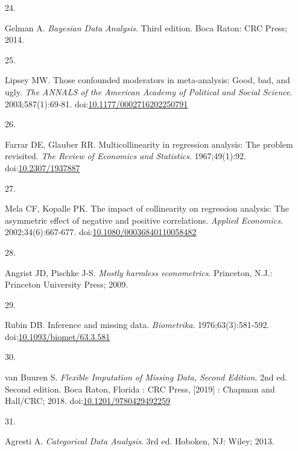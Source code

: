 \documentclass[
]{article}
\newlength{\cslhangindent}
\newlength{\csllabelwidth}
\newlength{\cslentryspacingunit} %
\newenvironment{CSLReferences}[2] %
 {%
  \setlength{\parindent}{0pt}
  \ifodd #1
  \let\oldpar\par
  \def\par{\hangindent=\cslhangindent\oldpar}
  \fi
  \setlength{\parskip}{#2\cslentryspacingunit}
 }%
 {}
\newcommand{\CSLLeftMargin}[1]{\parbox[t]{\csllabelwidth}{#1}}
\newcommand{\CSLRightInline}[1]{\parbox[t]{\linewidth - \csllabelwidth}{#1}\break}
\begin{document}
\begin{CSLReferences}{0}{0}
\leavevmode{}%
\CSLLeftMargin{24. }
\CSLRightInline{Gelman A. \emph{Bayesian Data Analysis}. Third edition. Boca Raton: CRC Press; 2014.}

\leavevmode{}%
\CSLLeftMargin{25. }
\CSLRightInline{Lipsey MW. Those confounded moderators in meta-analysis: Good, bad, and ugly. \emph{The ANNALS of the American Academy of Political and Social Science}. 2003;587(1):69-81. doi:\href{https://doi.org/10.1177/0002716202250791}{10.1177/0002716202250791}}

\leavevmode{}%
\CSLLeftMargin{26. }
\CSLRightInline{Farrar DE, Glauber RR. Multicollinearity in regression analysis: The problem revisited. \emph{The Review of Economics and Statistics}. 1967;49(1):92. doi:\href{https://doi.org/10.2307/1937887}{10.2307/1937887}}

\leavevmode{}%
\CSLLeftMargin{27. }
\CSLRightInline{Mela CF, Kopalle PK. The impact of collinearity on regression analysis: The asymmetric effect of negative and positive correlations. \emph{Applied Economics}. 2002;34(6):667-677. doi:\href{https://doi.org/10.1080/00036840110058482}{10.1080/00036840110058482}}

\leavevmode{}%
\CSLLeftMargin{28. }
\CSLRightInline{Angrist JD, Pischke J-S. \emph{Mostly harmless econometrics}. Princeton, N.J.: Princeton University Press; 2009.}

\leavevmode{}%
\CSLLeftMargin{29. }
\CSLRightInline{Rubin DB. Inference and missing data. \emph{Biometrika}. 1976;63(3):581-592. doi:\href{https://doi.org/10.1093/biomet/63.3.581}{10.1093/biomet/63.3.581}}

\leavevmode{}%
\CSLLeftMargin{30. }
\CSLRightInline{van Buuren S. \emph{Flexible Imputation of Missing Data, Second Edition}. 2nd ed. Second edition. \textbar{} Boca Raton, Florida : CRC Press, {[}2019{]} \textbar: Chapman and Hall/CRC; 2018. doi:\href{https://doi.org/10.1201/9780429492259}{10.1201/9780429492259}}

\leavevmode{}%
\CSLLeftMargin{31. }
\CSLRightInline{Agresti A. \emph{Categorical Data Analysis}. 3rd ed. Hoboken, NJ: Wiley; 2013.}


\end{CSLReferences}
\end{document}
